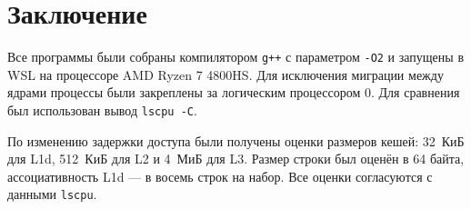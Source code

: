 \section*{Заключение}

Все программы были собраны компилятором \texttt{g++} с параметром \texttt{-O2} и запущены в WSL на процессоре AMD Ryzen 7 4800HS. Для исключения миграции между ядрами процессы были закреплены за логическим процессором 0. Для сравнения был использован вывод \texttt{lscpu -C}.

По изменению задержки доступа были получены оценки размеров кешей: 32~КиБ для L1d, 512~КиБ для L2 и 4~МиБ для L3. Размер строки был оценён в 64 байта, ассоциативность L1d --- в восемь строк на набор. Все оценки согласуются с данными \texttt{lscpu}.
